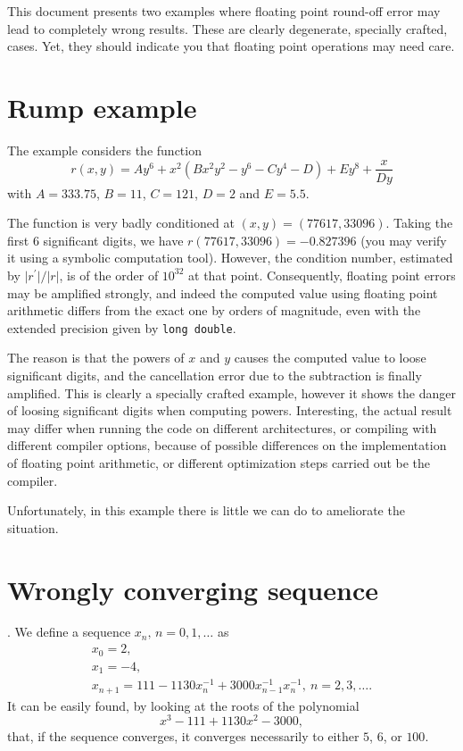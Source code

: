 \documentclass{article}
\begin{document}
This document presents two examples where floating point round-off error may lead to completely wrong results. These are clearly degenerate, specially crafted,  cases. Yet, they should indicate you that floating point operations may need care.

\section{Rump example}
The example considers the function
\[
  r(x,y)=Ay^6+x^2(Bx^2y^2-y^6-Cy^4-D)+Ey^8+\frac{x}{Dy}
\]
 with
  $A=333.75$, $B=11$, $C=121$, $D=2$ and $E=5.5$.
  
  The function is very badly conditioned at $(x,y)=(77617,33096)$.
  Taking the first $6$ significant digits, we have
  $r(77617,33096)=-0.827396$ (you may verify it using a symbolic
  computation tool). However, the condition number, estimated by
  $\vert r^\prime\vert/\vert r\vert$, is of the order of $10^{32}$ at
  that point. Consequently, floating point errors may be amplified
  strongly, and indeed the computed value using floating point
  arithmetic differs from the exact one by orders of magnitude, even
  with the extended precision given by \texttt{long double}.

  The reason is that the powers of $x$ and $y$ causes the computed
  value to loose significant digits, and the cancellation error due to
  the subtraction is finally amplified. This is clearly a specially
  crafted example, however it shows the danger of loosing significant
  digits when computing powers. Interesting, the actual result may
  differ when running the code on different architectures, or
  compiling with different compiler options, because of possible differences
  on the implementation of floating point arithmetic, or different
  optimization steps carried out be the compiler.

  Unfortunately, in this example there is little we can do to
  ameliorate the situation. 
  
\section{Wrongly converging sequence}.
We define a sequence $x_n,\, n=0,1,\ldots$ as
\[
  \begin{array}{l}
    x_0=2,\\
    x_1=-4,\\
    x_{n+1}=111-1130x_n^{-1}+3000x^{-1}_{n-1}x^{-1}_{n},\ n=2,3,\ldots.
  \end{array}
\]
    It can be easily found, by looking at the roots of the polynomial
    \[
    x^3-111+1130x^2-3000,
    \]
    that, if the sequence converges, it converges necessarily to either
    $5$, $6$, or $100$.
    
\end{document}
